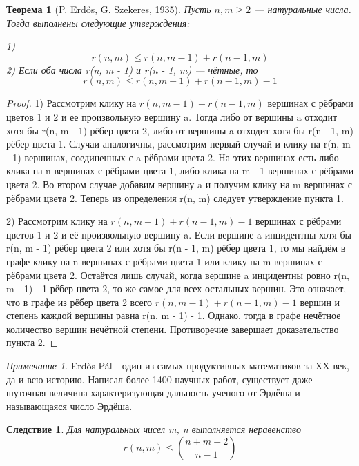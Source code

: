 \documentclass{article}
\renewcommand{\le}{\leqslant}
\renewcommand{\ge}{\geqslant}
\newtheorem{theorem}{Теорема}
\newtheorem{consequence}{Следствие}
\theoremstyle{definition}
\theoremstyle{remark}
\newtheorem*{remark}{Примечание}
\begin{document}
\begin{theorem} [P. Erdős, G. Szekeres, 1935]
    Пусть $n, m \ge 2$ — натуральные числа. Тогда выполнены следующие утверждения:
    
    1) 
    $$ r(n, m) \le r(n, m - 1) + r(n - 1, m) $$
    2) Если оба числа r(n, m - 1) и r(n - 1, m) — чётные, то
    $$ r(n, m) \le r(n, m - 1) + r(n - 1, m) - 1$$
    
\end{theorem}
\begin{proof}
1) Рассмотрим клику на $r(n, m - 1) + r(n - 1, m)$ вершинах с рёбрами цветов 1 и 2 и ее произвольную вершину a. Тогда либо от вершины a отходит хотя бы r(n, m - 1) рёбер цвета 2, либо от вершины a отходит хотя бы r(n - 1, m) рёбер цвета 1. Случаи аналогичны,
рассмотрим первый случай и клику на r(n, m - 1) вершинах, соединенных
с a рёбрами цвета 2. На этих вершинах есть либо клика на n вершинах
с рёбрами цвета 1, либо клика на m - 1 вершинах с рёбрами цвета 2.
Во втором случае добавим вершину a и получим клику на m вершинах
с рёбрами цвета 2. Теперь из определения r(n, m) следует утверждение
пункта 1.

2) Рассмотрим клику на $r(n, m - 1) + r(n - 1, m) - 1$ вершинах с
рёбрами цветов 1 и 2 и её произвольную вершину a. Если вершине a
инцидентны хотя бы r(n, m - 1) рёбер цвета 2 или хотя бы r(n - 1, m)
рёбер цвета 1, то мы найдём в графе клику на n вершинах с рёбрами
цвета 1 или клику на m вершинах с рёбрами цвета 2. Остаётся лишь
случай, когда вершине a инцидентны ровно r(n, m - 1) - 1 рёбер цвета
2, то же самое для всех остальных вершин. Это означает, что в графе из
рёбер цвета 2 всего $r(n, m - 1) +r(n -1, m) - 1$ вершин и степень каждой
вершины равна r(n, m - 1) - 1. Однако, тогда в графе
нечётное количество вершин нечётной степени. Противоречие завершает
доказательство пункта 2.
\end{proof}

\begin{remark}
    Erdős Pál - один из самых продуктивных математиков за XX век, да и всю историю.  Написал более 1400 научных работ, существует даже шуточная величина характеризующая дальность ученого от Эрдёша и называющаяся число Эрдёша.
\end{remark}

\begin{consequence}
    Для натуральных чисел m, n выполняется неравенство
    $$
    r(n,m) \le \binom{n+m-2}{n-1}
    $$
\end{consequence}
\end{document}
